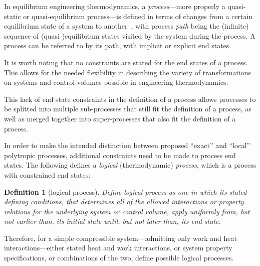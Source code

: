 \documentclass[fleqn,10pt]{SelfArx}
\newtheorem{definition}{Definition}
\begin{document}
    In equilibrium engineering thermodynamics, a \emph{process}---more properly  a  quasi-static
    or quasi-equilibrium process---is defined in terms of changes  from  a  certain  equilibrium
    state of a system to  another~\cite{2013-CengelYA+BolesMA-AMGH},  with  process  \emph{path}
    being the (infinite) sequence of (quasi-)equilibrium states visited by the system during the
    process. A process can be referred to by its path, with implicit or explicit end states.

    It is worth noting that no constraints are stated for the end  states  of  a  process.  This
    allows for the needed flexibility in describing the variety of  transformations  on  systems
    and control volumes possible in engineering thermodynamics.

    This lack of end state constraints in the definition of a process  allows  processes  to  be
    splitted into multiple sub-processes that still fit the definition of a process, as well as
    merged together into super-processes that also fit the definition of a process.

    In order  to  make  the  intended  distinction  between  proposed  ``exact''  and  ``local''
    polytropic processes, additional constraints need to be made  to  process  end  states.  The
    following defines a \emph{logical} (thermodynamic) \emph{process}, which is a  process  with
    constrained end states:

    \begin{definition}[logical process]\label{def:logical.proc}
        Define logical process as one in which its stated defining conditions,  that  determines
        all of the allowed interactions or property  relations  for  the  underlying  system  or
        control volume, apply uniformly from, but not earlier than, its initial state until, but
        not later than, its end state.
    \end{definition}

    Therefore,   for   a   simple   compressible   system---admitting   only   work   and   heat
    interactions---either stated heat and work interactions, or system property  specifications,
    or combinations of the two, define possible logical processes.
\end{document}

